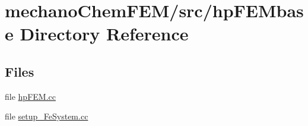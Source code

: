 \section{mechano\-Chem\-F\-E\-M/src/hp\-F\-E\-Mbase Directory Reference}
\label{dir_6058f7ae2cdf4074eeec280bbf56691a}
\subsection*{Files}
\begin{DoxyCompactItemize}
\item 
file \hyperlink{hp_f_e_m_8cc}{hp\-F\-E\-M.\-cc}
\item 
file \hyperlink{setup___fe_system_8cc}{setup\-\_\-\-Fe\-System.\-cc}
\end{DoxyCompactItemize}
